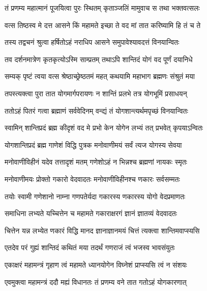 \twolineshloka
{तं प्रणम्य महात्मानं पूजयित्वा पुरः स्थितम्}
{कृताञ्जलिं मामुवाच स तथा भक्तवत्सलः} %


\twolineshloka
{वत्स तिष्ठस्व मे दत्त आसने किं महामते}
{इच्छा ते वद मां तात करिष्यामि हि तं च ते} %

\twolineshloka
{तस्य तद्वचनं श्रुत्वा हर्षितोऽहं नराधिप}
{आसने समुपावेश्यावदत्तं विनयान्वितः} %


\twolineshloka
{तव दर्शनमात्रेण कृतकृत्योऽस्मि साम्प्रतम्}
{तथाऽपि शान्तिदं योगं वद पूर्णं दयानिधे} %


\twolineshloka
{सम्यक् पृष्टं त्वया वत्स श्रेष्ठाच्छ्रेष्ठतमं महत्}
{कथयामि महाभाग ब्रह्मणः संश्रुतं मया} %

\twolineshloka
{तपस्त्यक्त्वा पुरा तात योगमार्गपरायणः}
{न शान्तिं प्रलभे तत्र योगभूमिं प्रसाधयन्} %

\twolineshloka
{ततोऽहं पितरं गत्वा ब्रह्माणं सर्ववेदिनम्}
{वन्द्यं तं योगशान्त्यर्थमपृच्छं विनयान्वितः} %

\twolineshloka
{स्वामिन् शान्तिप्रदं ब्रह्म कीदृशं वद मे प्रभो}
{केन योगेन लभ्यं तत् प्रभवेत् कृपयाऽन्वितः} %


\twolineshloka
{योगशान्तिप्रदं ब्रह्म गाणेशं विद्धि पुत्रक}
{मनोवाणीमयं सर्वं त्यज योगस्य सेवया} %

\twolineshloka
{मनोवाणीविहीनं यदेव तत्तादृशं मतम्}
{गणेशोऽहं न भिन्नश्च ब्रह्मणां नायकः स्मृतः} %

\twolineshloka
{मनोवाणीमयः प्रोक्तो गकारो वेदवादतः}
{मनोवाणीविहीनश्च णकारः सर्वसम्मतः} %

\twolineshloka
{तयोः स्वामी गणेशानो नाम्ना गणपतेर्यदा}
{गकारस्य णकारस्य योगो वेदप्रमाणतः} %

\twolineshloka
{समाधिना लभ्यते यच्चित्तेन च महामते}
{गकाराक्षरगं ज्ञानं ज्ञातव्यं वेदवादतः} %

\twolineshloka
{चित्तेन यन्न लभ्येत णकारं विद्धि मानद}
{ज्ञानाज्ञानमयं चित्तं त्यक्त्वा शान्तिमवाप्स्यसि} %

\twolineshloka
{एतदेव परं गुह्यं शान्तिदं कथितं मया}
{तदर्थं गणराजं त्वं भजस्व भावसंयुतः} %

\twolineshloka
{एकाक्षरं महामन्त्रं गृहाण त्वं महामते}
{ध्यानयोगेन विघ्नेशं प्राप्स्यसि त्वं न संशयः} %

\twolineshloka
{एवमुक्त्वा महामन्त्रं ददौ मह्यं विधानतः}
{तं प्रणम्य वने तात गतोऽहं योगकारणात्} %

